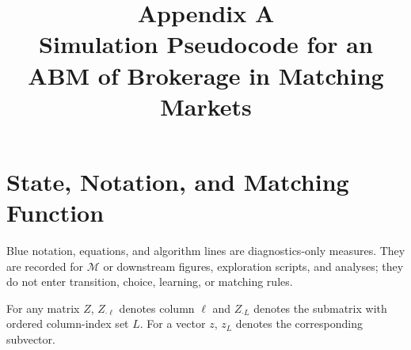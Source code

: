 \documentclass[11pt]{article}
\title{Appendix A\\Simulation Pseudocode for an ABM of Brokerage in Matching Markets}
\author{}
\date{}
\newcommand{\diag}[1]{\textcolor{diagblue}{#1}}
\begin{document}
\maketitle

\section{State, Notation, and Matching Function}

\diag{Blue notation, equations, and algorithm lines are diagnostics-only measures. They are recorded for $\mathcal M$ or downstream figures, exploration scripts, and analyses; they do not enter transition, choice, learning, or matching rules.}

For any matrix $Z$, $Z_{\cdot\ell}$ denotes column $\ell$ and $Z_{\cdot L}$ denotes the submatrix with ordered column-index set $L$. For a vector $z$, $z_L$ denotes the corresponding subvector.
\end{document}
